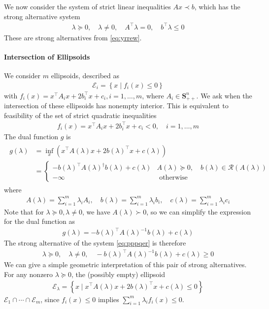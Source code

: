 \documentclass{article}
\begin{document}
We now consider the system of strict linear inequalities $A x \prec b$, which has the strong alternative system
\begin{align*}
\lambda \succeq 0, \quad \lambda \neq 0, \quad A^{\top} \lambda=0, \quad b^{\top} \lambda \leq 0
\end{align*}
These are strong alternatives from \cref{eq:yrrew}. 

\paragraph{Intersection of Ellipsoids}
We consider $m$ ellipsoids, described as
\begin{align*}
\mathcal{E}_{i}=\left\{x \mid f_{i}(x) \leq 0\right\}
\end{align*}
with $f_{i}(x)=x^{\top} A_{i} x+2 b_{i}^{\top} x+c_{i}, i=1, \ldots, m$, where $A_{i} \in \mathbf{S}_{++}^{n} .$ We ask when the intersection of these ellipsoids has nonempty interior. This is equivalent to feasibility of the set of strict quadratic inequalities
\begin{align}
f_{i}(x)=x^{\top} A_{i} x+2 b_{i}^{\top} x+c_{i}<0, \quad i=1, \ldots, m\label{eq:pppqer}
\end{align}
The dual function $g$ is
\begin{align*}
\begin{aligned}
g(\lambda) &=\inf _{x}\left(x^{\top} A(\lambda) x+2 b(\lambda)^{\top} x+c(\lambda)\right) \\
&= \begin{cases}-b(\lambda)^{\top} A(\lambda)^{\dagger} b(\lambda)+c(\lambda) & A(\lambda) \succeq 0, \quad b(\lambda) \in \mathcal{R}(A(\lambda)) \\
-\infty & \text { otherwise }\end{cases}
\end{aligned}
\end{align*}
where
\begin{align*}
A(\lambda)=\sum_{i=1}^{m} \lambda_{i} A_{i}, \quad b(\lambda)=\sum_{i=1}^{m} \lambda_{i} b_{i}, \quad c(\lambda)=\sum_{i=1}^{m} \lambda_{i} c_{i}
\end{align*}
Note that for $\lambda \succeq 0, \lambda \neq 0$, we have $A(\lambda) \succ 0$, so we can simplify the expression for the dual function as
\begin{align*}
g(\lambda)=-b(\lambda)^{\top} A(\lambda)^{-1} b(\lambda)+c(\lambda)
\end{align*}
The strong alternative of the system \cref{eq:pppqer} is therefore
\begin{align}
\lambda \succeq 0, \quad \lambda \neq 0, \quad-b(\lambda)^{\top} A(\lambda)^{-1} b(\lambda)+c(\lambda) \geq 0 \label{eq:pppqer1}
\end{align}
We can give a simple geometric interpretation of this pair of strong alternatives. For any nonzero $\lambda \succeq 0$, the (possibly empty) ellipsoid
\begin{align*}
\mathcal{E}_{\lambda}=\left\{x \mid x^{\top} A(\lambda) x+2 b(\lambda)^{\top} x+c(\lambda) \leq 0\right\}
\end{align*}
 $\mathcal{E}_{1} \cap \cdots \cap \mathcal{E}_{m}$, since $f_{i}(x) \leq 0$ implies $\sum_{i=1}^{m} \lambda_{i} f_{i}(x) \leq 0 .$ 
\end{document}
